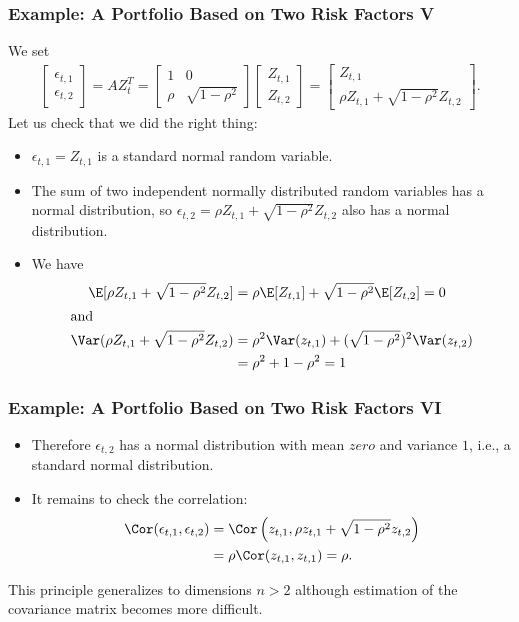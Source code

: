 \begin{frame}[fragile]
\frametitle{Example: A Portfolio Based on Two Risk Factors V}
We set
\begin{align*}
  \left[\begin{array}{c} \epsilon_{t,1}\\
  	\epsilon_{t,2} \end{array}\right] = A Z_t^T =
  	\left[\begin{array}{cc} 1& 0 \\
  	\rho &\sqrt{1-\rho^2} \end{array}\right]\left[\begin{array}{c} Z_{t,1} \\
  	Z_{t,2} \end{array}\right] = \left[\begin{array}{c} Z_{t,1}\\
  	\rho Z_{t,1} +\sqrt{1-\rho^2}Z_{t,2} \end{array}\right].
\end{align*}
Let us check that we did the right thing:
\begin{itemize}
  \item $\epsilon_{t,1}=Z_{t,1}$ is a standard normal random variable.
  \item The sum of two independent normally distributed random variables has a
  normal distribution, so $\epsilon_{t,2}=\rho Z_{t,1} +\sqrt{1-\rho^2}Z_{t,2}$
  also has a normal distribution.
  \item We have
  \abovedisplayskip=2pt
  	\begin{align*}
  		\E[\rho Z_{t,1} +\sqrt{1-\rho^2}Z_{t,2}] &= \rho\E[Z_{t,1}] +
  		\sqrt{1-\rho^2}\E[Z_{t,2}] = 0\\
  	\intertext{and}
  	\Var(\rho Z_{t,1} +\sqrt{1-\rho^2}Z_{t,2}) &= \rho^2\Var(z_{t,1}) + (\sqrt{1-\rho^2})^2
  \Var(z_{t,2})\\
   &= \rho^2 + 1 -\rho^2 =1
	\end{align*}
\end{itemize}
\end{frame}

\begin{frame}[fragile]
\frametitle{Example: A Portfolio Based on Two Risk Factors VI}
\begin{itemize}
  \item Therefore $\epsilon_{t,2}$ has a normal distribution with mean $zero$ and
	variance $1$, i.e., a standard normal distribution.
  \item It remains to check the correlation:
	\begin{align*}
	  \Cor(\epsilon_{t,1},\epsilon_{t,2}) &= \Cor\left(z_{t,1},\rho z_{t,1} +
	  \sqrt{1-\rho^2}z_{t,2}\right)\\ 
	   &= \rho \Cor(z_{t,1},z_{t,1}) =\rho.
	\end{align*}
\end{itemize}
This principle generalizes to dimensions $n>2$ although estimation of the
covariance matrix becomes more difficult.
\end{frame}

